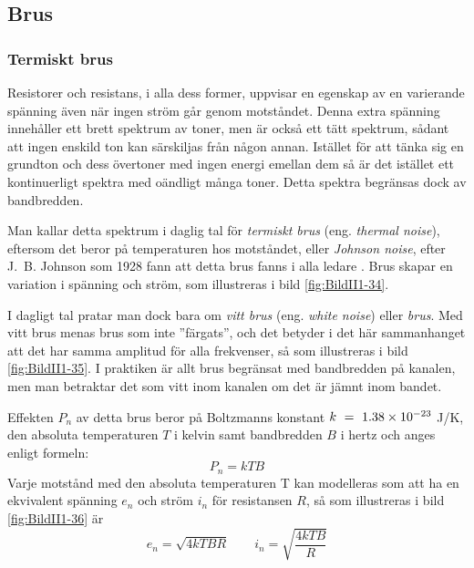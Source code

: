 \subsection{Brus}
\label{termisktbrus}

\subsubsection{Termiskt brus}

Resistorer och resistans, i alla dess former, uppvisar en egenskap av
en varierande spänning även när ingen ström går genom motståndet.
Denna extra spänning innehåller ett brett spektrum av toner, men är
också ett tätt spektrum, sådant att ingen enskild ton kan särskiljas
från någon annan.
  Istället för att tänka sig en grundton och dess övertoner med ingen
energi emellan dem så är det istället ett kontinuerligt spektra med
oändligt många toner.
Detta spektra begränsas dock av bandbredden.




Man kallar detta spektrum i daglig tal för \emph{termiskt brus}
(eng. \emph{thermal noise}), eftersom det beror på temperaturen hos motståndet,
eller \emph{Johnson noise}, efter J.~B. Johnson som 1928 fann att detta brus
fanns i alla ledare \cite{ott1988}.
Brus skapar en variation i spänning och ström, som illustreras i bild
\ref{fig:BildII1-34}.

I dagligt tal pratar man dock bara om \emph{vitt brus} (eng.
\emph{white noise}) eller \emph{brus}.
Med vitt brus menas brus som inte ''färgats'', och det betyder i det här
sammanhanget att det har samma amplitud för alla frekvenser, så som illustreras
i bild \ref{fig:BildII1-35}.
I praktiken är allt brus begränsat med bandbredden på kanalen, men man
betraktar det som vitt inom kanalen om det är jämnt inom bandet.

Effekten \(P_n\) av detta brus beror på Boltzmanns konstant
\(k\ =\ \num{1,38d-23}\) J/K, den absoluta temperaturen \(T\) i
kelvin samt bandbredden \(B\) i hertz och anges enligt formeln:
\[P_n = k T B\]
Varje motstånd med den absoluta temperaturen T kan modelleras som att ha en
ekvivalent spänning \(e_n\) och ström \(i_n\) för resistansen \(R\),
så som illustreras i bild \ref{fig:BildII1-36} är
\[e_n = \sqrt{4kTBR}\qquad i_n = \sqrt{\dfrac{4kTB}{R}}\]
